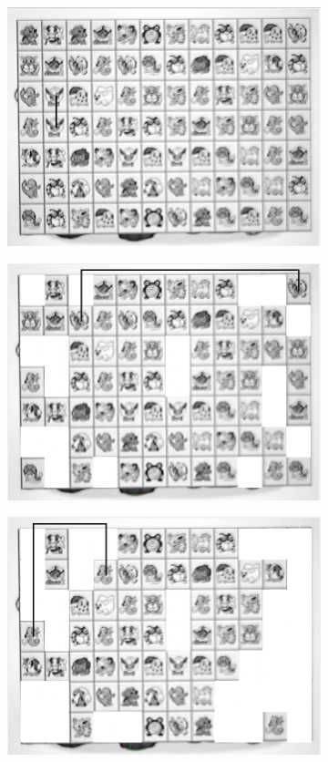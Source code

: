 \documentclass{article}
\numberwithin{figure}{section}
\numberwithin{table}{section}
\numberwithin{listing}{section}
\numberwithin{equation}{section}
\begin{document}
\begin{enumerate}
                \begin{figure}[H]
                    \centering
                    \begin{subfigure}{0.5\textwidth}
                        \centering
                        \includegraphics[width=0.8\linewidth]{mocklink1}
                    \end{subfigure}%
                    \begin{subfigure}{0.5\textwidth}
                        \centering
                        \includegraphics[width=0.8\linewidth]{mocklink2}
                    \end{subfigure}
                    \begin{subfigure}{0.5\textwidth}
                        \centering
                        \includegraphics[width=0.8\linewidth]{mocklink3}

\end{subfigure}
\end{figure}
\end{enumerate}
\end{document}
